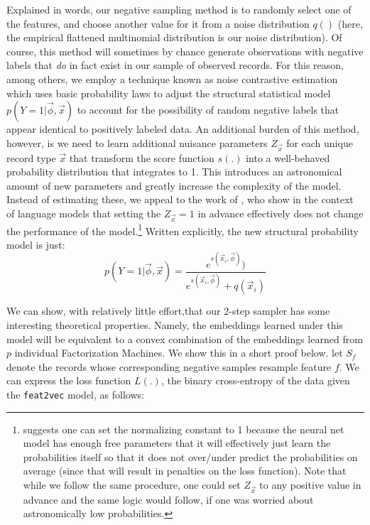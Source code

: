 \documentclass{article} %
\renewcommand{\cite}[1]{\citep{#1}}
\begin{document}
Explained in words, our negative sampling method is to randomly select one of the features, and choose another value for it from a noise distribution $q()$ (here, the empirical flattened multinomial distribution is our noise distribution). Of course, this method will sometimes by chance generate observations with negative labels that \textit{do} in fact exist in our sample of observed records. For this reason, among others, we employ  a technique known as noise contrastive estimation\cite{nce} which uses basic probability laws to adjust the structural statistical model $p(Y=1|\vec{\phi},\vec{x})$ to account for the possibility of random negative labels that appear identical to positively labeled data. An additional burden of this method, however, is we need to learn additional nuisance parameters $Z_{\vec{x}}$ for each unique record type $\vec{x}$ that transform the score function $s(.)$ into a well-behaved probability distribution that integrates to 1. This introduces an astronomical amount of new parameters and greatly increase the complexity of the model. Instead of estimating these, we appeal to the work of \cite{fastnnlang}, who show in the context of language models that setting the $Z_{\vec{x}}=1$ in advance effectively does not change the performance of the model.\footnote{\cite{fastnnlang} suggests one can set the normalizing constant to 1 because the neural net model has enough free parameters that it will effectively just learn the probabilities itself so that it does not over/under predict the probabilities on average (since that will result in penalties on the loss function). Note that while we follow the same procedure, one could set $Z_{\vec{x}}$ to any positive value in advance and the same logic would follow, if one was worried about astronomically low probabilities.}  Written explicitly, the new structural probability model is just:
\[p(Y=1|\vec{\phi},\vec{x}) = \frac{e^{s(\vec{x}_i,\vec{\phi}) })}{e^{s(\vec{x}_i,\vec{\phi}) } + q(\vec{x}_i) }\]

We can show, with relatively little effort,that our 2-step sampler has some interesting theoretical properties. Namely, the embeddings learned under this model will be equivalent to a convex combination of the embeddings learned from $p$ individual Factorization Machines. We show this in a short proof below. let $S_f$ denote the records whose corresponding negative samples resample feature $f$. We can express the loss function $L(.)$, the binary cross-entropy of the data given the \texttt{feat2vec} model, as follows:
\end{document}

